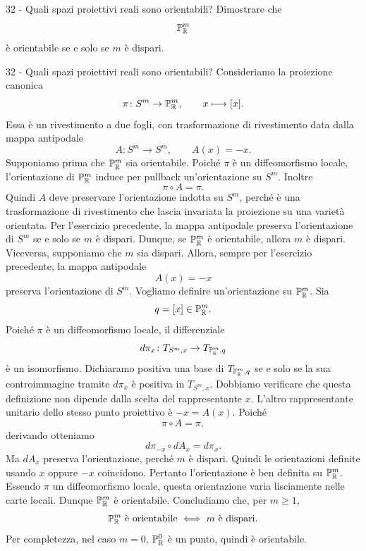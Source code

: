 \documentclass[a4paper]{article}
\begin{document}
\begin{snippetexercise}{32 - Quali spazi proiettivi reali sono orientabili?}
    Dimostrare che
    \[
        \mathbb{P}^m_{\mathbb{R}}
    \]
    è orientabile se e solo se \(m\) è dispari.
\end{snippetexercise}

\begin{snippetsolution}{32 - Quali spazi proiettivi reali sono orientabili?}
    Consideriamo la proiezione canonica
    \[
        \pi\colon S^m\to\mathbb{P}^m_{\mathbb{R}},
        \qquad
        x\longmapsto [x].
    \]
    Essa è un rivestimento a due fogli, con trasformazione di rivestimento data dalla mappa antipodale
    \[
        A\colon S^m\to S^m,
        \qquad
        A(x)=-x.
    \]
    Supponiamo prima che \(\mathbb{P}^m_{\mathbb{R}}\) sia orientabile. Poiché \(\pi\) è un diffeomorfismo locale, l'orientazione di \(\mathbb{P}^m_{\mathbb{R}}\) induce per pullback un'orientazione su \(S^m\). Inoltre
    \[
        \pi\circ A=\pi.
    \]
    Quindi \(A\) deve preservare l'orientazione indotta su \(S^m\), perché è una trasformazione di rivestimento che lascia invariata la proiezione su una varietà orientata. Per l'esercizio precedente, la mappa antipodale preserva l'orientazione di \(S^m\) se e solo se \(m\) è dispari. Dunque, se \(\mathbb{P}^m_{\mathbb{R}}\) è orientabile, allora \(m\) è dispari.
    Viceversa, supponiamo che \(m\) sia dispari. Allora, sempre per l'esercizio precedente, la mappa antipodale
    \[
        A(x)=-x
    \]
    preserva l'orientazione di \(S^m\). Vogliamo definire un'orientazione su \(\mathbb{P}^m_{\mathbb{R}}\). Sia
    \[
        q=[x]\in\mathbb{P}^m_{\mathbb{R}}.
    \]
    Poiché \(\pi\) è un diffeomorfismo locale, il differenziale
    \[
        d\pi_x\colon T_{S^m,x}\to T_{\mathbb{P}^m_{\mathbb{R}},q}
    \]
    è un isomorfismo. Dichiaramo positiva una base di \(T_{\mathbb{P}^m_{\mathbb{R}},q}\) se e solo se la sua controimmagine tramite \(d\pi_x\) è positiva in \(T_{S^m,x}\).
    Dobbiamo verificare che questa definizione non dipende dalla scelta del rappresentante \(x\). L'altro rappresentante unitario dello stesso punto proiettivo è \(-x=A(x)\). Poiché
    \[
        \pi\circ A=\pi,
    \]
    derivando otteniamo
    \[
        d\pi_{-x}\circ dA_x=d\pi_x.
    \]
    Ma \(dA_x\) preserva l'orientazione, perché \(m\) è dispari. Quindi le orientazioni definite usando \(x\) oppure \(-x\) coincidono. Pertanto l'orientazione è ben definita su \(\mathbb{P}^m_{\mathbb{R}}\).
    Essendo \(\pi\) un diffeomorfismo locale, questa orientazione varia lisciamente nelle carte locali. Dunque \(\mathbb{P}^m_{\mathbb{R}}\) è orientabile.
    Concludiamo che, per \(m\geq1\),
    \[
        \mathbb{P}^m_{\mathbb{R}}
        \text{ è orientabile}
        \iff
        m \text{ è dispari}.
    \]
    Per completezza, nel caso \(m=0\), \(\mathbb{P}^0_{\mathbb{R}}\) è un punto, quindi è orientabile.
\end{snippetsolution}
\end{document}
